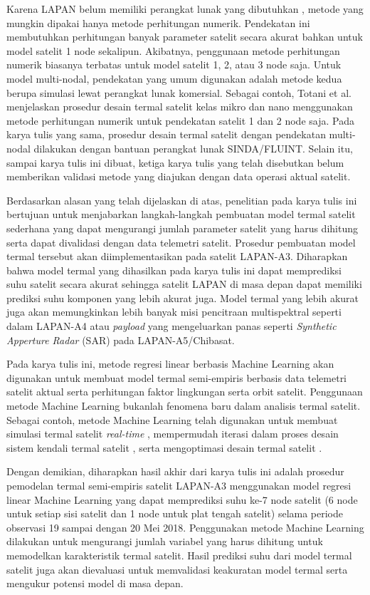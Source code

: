 Karena LAPAN belum memiliki perangkat lunak yang dibutuhkan
\cite{budiantoro2019}, metode yang mungkin dipakai hanya metode perhitungan
numerik. Pendekatan ini membutuhkan perhitungan banyak parameter satelit secara
akurat bahkan untuk model satelit 1 node sekalipun. Akibatnya, penggunaan
metode perhitungan numerik biasanya terbatas untuk model satelit 1, 2, atau 3
node saja. Untuk model multi-nodal, pendekatan yang umum digunakan adalah
metode kedua berupa simulasi lewat perangkat lunak komersial. Sebagai contoh,
Totani et al. \cite{totani2014} menjelaskan prosedur desain termal satelit
kelas mikro dan nano menggunakan metode perhitungan numerik untuk pendekatan
satelit 1 dan 2 node saja. Pada karya tulis yang sama, prosedur desain termal
satelit dengan pendekatan multi-nodal dilakukan dengan bantuan perangkat lunak
SINDA/FLUINT. Selain itu, sampai karya tulis ini dibuat, ketiga karya tulis
yang telah disebutkan belum memberikan validasi metode yang diajukan dengan
data operasi aktual satelit.

Berdasarkan alasan yang telah dijelaskan di atas, penelitian pada karya tulis
ini bertujuan untuk menjabarkan langkah-langkah pembuatan model termal satelit
sederhana yang dapat mengurangi jumlah parameter satelit yang harus dihitung
serta dapat divalidasi dengan data telemetri satelit. Prosedur pembuatan model
termal tersebut akan diimplementasikan pada satelit LAPAN-A3. Diharapkan bahwa
model termal yang dihasilkan pada karya tulis ini dapat memprediksi suhu
satelit secara akurat sehingga satelit LAPAN di masa depan dapat memiliki
prediksi suhu komponen yang lebih akurat juga. Model termal yang lebih akurat
juga akan memungkinkan lebih banyak misi pencitraan multispektral seperti dalam
LAPAN-A4 atau \textit{payload} yang mengeluarkan panas seperti
\textit{Synthetic Apperture Radar} (SAR) pada LAPAN-A5/Chibasat.


Pada karya tulis ini, metode regresi linear berbasis Machine Learning akan
digunakan untuk membuat model termal semi-empiris berbasis data telemetri
satelit aktual serta perhitungan faktor lingkungan serta orbit satelit.
Penggunaan metode Machine Learning bukanlah fenomena baru dalam analisis termal
satelit. Sebagai contoh, metode Machine Learning telah digunakan untuk membuat
simulasi termal satelit \textit{real-time} \cite{junior2017}, mempermudah
iterasi dalam proses desain sistem kendali termal satelit \cite{escobar2016},
serta mengoptimasi desain termal satelit \cite{xiong2020}.

Dengan demikian, diharapkan hasil akhir dari karya tulis ini adalah prosedur
pemodelan termal semi-empiris satelit LAPAN-A3 menggunakan model regresi linear
Machine Learning yang dapat memprediksi suhu ke-7 node satelit (6 node untuk
setiap sisi satelit dan 1 node untuk plat tengah satelit) selama periode
observasi 19 sampai dengan 20 Mei 2018. Penggunakan metode Machine Learning
dilakukan untuk mengurangi jumlah variabel yang harus dihitung untuk memodelkan
karakteristik termal satelit. Hasil prediksi suhu dari model termal satelit
juga akan dievaluasi untuk memvalidasi keakuratan model termal serta mengukur
potensi model di masa depan.


